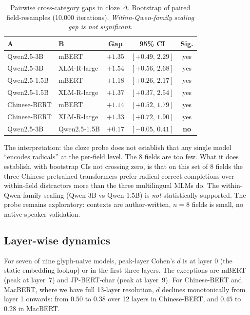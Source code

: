 \documentclass[11pt,a4paper,twocolumn]{article}
\begin{document}
\begin{table}[t!]
\centering
\caption{Pairwise cross-category gaps in cloze
$\overline{\Delta}$. Bootstrap of paired field-resamples (10{,}000
iterations). \emph{Within-Qwen-family scaling gap is not significant.}}
\label{tab:cloze-pairwise}
\footnotesize
\setlength{\tabcolsep}{3pt}
\begin{tabular}{llccc}
\toprule
\textbf{A} & \textbf{B} & \textbf{Gap} & \textbf{95\% CI} & \textbf{Sig.}\\
\midrule
Qwen2.5-3B    & mBERT        & $+1.35$ & $[+0.49,\,2.29]$ & yes \\
Qwen2.5-3B    & XLM-R-large  & $+1.54$ & $[+0.56,\,2.68]$ & yes \\
Qwen2.5-1.5B  & mBERT        & $+1.18$ & $[+0.26,\,2.17]$ & yes \\
Qwen2.5-1.5B  & XLM-R-large  & $+1.37$ & $[+0.37,\,2.54]$ & yes \\
Chinese-BERT  & mBERT        & $+1.14$ & $[+0.52,\,1.79]$ & yes \\
Chinese-BERT  & XLM-R-large  & $+1.33$ & $[+0.72,\,1.90]$ & yes \\
Qwen2.5-3B    & Qwen2.5-1.5B & $+0.17$ & $[-0.05,\,0.41]$ & \textbf{no} \\
\bottomrule
\end{tabular}
\end{table}

The interpretation: the cloze probe does not establish that any single
model ``encodes radicals'' at the per-field level. The 8 fields are
too few. What it does establish, with bootstrap CIs not crossing zero,
is that on this set of 8 fields the three Chinese-pretrained
transformers prefer radical-correct completions over within-field
distractors more than the three multilingual MLMs do. The
within-Qwen-family scaling (Qwen-3B vs Qwen-1.5B) is \emph{not}
statistically supported. The probe remains exploratory: contexts are
author-written, $n = 8$ fields is small, no native-speaker validation.

\subsection{Layer-wise dynamics}
For seven of nine glyph-naive models, peak-layer Cohen's $d$ is at
layer 0 (the static embedding lookup) or in the first three layers.
The exceptions are mBERT (peak at layer~7) and JP-BERT-char (peak at
layer~9). For Chinese-BERT and MacBERT, where we have full 13-layer
resolution, $d$ declines monotonically from layer 1 onwards: from
$0.50$ to $0.38$ over 12 layers in Chinese-BERT, and $0.45$ to $0.28$
in MacBERT.
\end{document}
